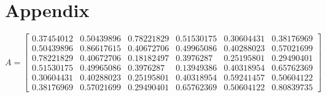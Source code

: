 \onecolumn
\setcounter{equation}{0}
\renewcommand\theequation{A.\arabic{equation}}
\section*{Appendix}
\label{sec:appendix}

\begin{equation}\label{matrix:A}
A = \begin{bmatrix}
0.37454012 & 0.50439896 & 0.78221829 & 0.51530175 & 0.30604431 & 0.38176969 \\
0.50439896 & 0.86617615 & 0.40672706 & 0.49965086 & 0.40288023 & 0.57021699 \\
0.78221829 & 0.40672706 & 0.18182497 & 0.3976287  & 0.25195801 & 0.29490401 \\
0.51530175 & 0.49965086 & 0.3976287  & 0.13949386 & 0.40318954 & 0.65762369 \\
0.30604431 & 0.40288023 & 0.25195801 & 0.40318954 & 0.59241457 & 0.50604122 \\
0.38176969 & 0.57021699 & 0.29490401 & 0.65762369 & 0.50604122 & 0.80839735 
\end{bmatrix}
\end{equation}

